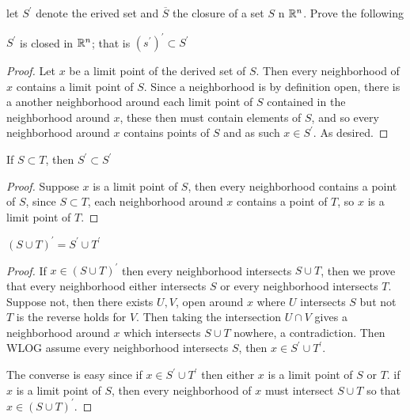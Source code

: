     \question
    let $S^\prime$ denote the erived set and $\overline{S}$ the closure of a set $S$ n $\mathbb{R}^n$. Prove the 
    following 

    \begin{alphaparts}
        \questionpart 
        $S^\prime$ is closed in $\mathbb{R}^n$; that is $(s^\prime)^\prime \subset S^\prime$ 

        \begin{proof}
            Let $x$ be a limit point of the derived set of $S$. Then every neighborhood of $x$ contains a limit 
            point of $S$. Since a neighborhood is by definition open, there is a another neighborhood around each limit point 
            of $S$ contained in the neighborhood around $x$, these then must contain elements of $S$, and so every neighborhood around $x$ 
            contains points of $S$ and as such $x \in S^\prime$. As desired. 
        \end{proof}

        \questionpart 
        If $S \subset T$, then $S^\prime \subset S^\prime$ 

        \begin{proof}
            Suppose $x$ is a limit point of $S$, then every neighborhood contains a point of $S$, 
            since $S \subset T$, each neighborhood around $x$ contains a point of $T$, so $x$ is a limit point of $T$. 

        \end{proof}

        \questionpart 
        $(S \cup T)^\prime = S^\prime \cup T^\prime$

        \begin{proof}
            If $x \in (S \cup T)^\prime$ then every neighborhood intersects $S \cup T$, 
            then we prove that every neighborhood either intersects $S$ or every neighborhood intersects $T$. Suppose 
            not, then there exists $U, V$, open around $x$ where $U$ intersects $S$ but not $T$ is the reverse holds for $V$. 
            Then taking the intersection $U \cap V$ gives a neighborhood around $x$ which intersects $S \cup T$ nowhere, a contradiction. 
            Then WLOG assume every neighborhood intersects $S$, then $x \in S^\prime \cup T^\prime$. 

            The converse is easy since if $x \in S^\prime \cup T^\prime$ then either $x$ is a limit point of $S$ or $T$. 
            if $x$ is a limit point of $S$, then every neighborhood of $x$ must intersect $S \cup T$ so that $x \in (S \cup T)^\prime$. 


\end{proof}
\end{alphaparts}
